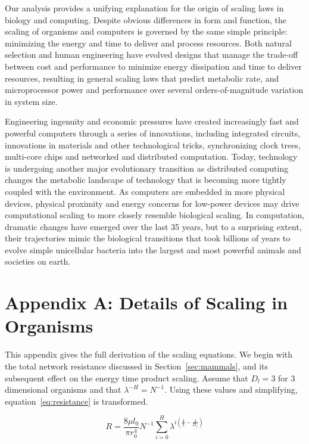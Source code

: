 \documentclass[12pt]{article}
\begin{document}
Our analysis provides a unifying explanation for the origin of scaling laws in
biology and computing. Despite obvious differences in form and function, the
scaling of organisms and computers is governed by the same simple principle: minimizing the energy and time to deliver and process resources. Both natural selection and human engineering have evolved designs that manage the trade-off between cost and performance to minimize energy dissipation and time to deliver resources, resulting in general scaling laws that predict metabolic rate, and microprocessor power and performance over several orders-of-magnitude variation in system size. 

Engineering ingenuity and economic pressures have created increasingly
fast and powerful computers through a series of innovations, including
integrated circuits, innovations in materials and other technological
tricks, synchronizing clock trees, multi-core chips and networked and
distributed computation. Today, technology is undergoing another
major evolutionary transition as distributed computing changes the
metabolic landscape of technology that is becoming more tightly coupled with the
environment. As computers are embedded in more physical devices,
physical proximity and energy concerns for low-power devices may drive
computational scaling to more closely resemble biological scaling. In
computation, dramatic changes have emerged over the last 35 years, but
to a surprising extent, their trajectories mimic the biological
transitions that took billions of years to evolve simple unicellular
bacteria into the largest and most powerful animals and societies on
earth.


\newpage

\section{Appendix A: Details of Scaling in Organisms}
\label{sec:AppendixOrg}

This appendix gives the full derivation of the scaling equations.  We
begin with the total network resistance discussed in
Section~\ref{sec:mammals}, and its subsequent effect on the energy
time product scaling. Assume that $D_l = 3$ for $3$ dimensional
organisms and that $\lambda^{-H}=N^{-1}$.  Using these values and
simplifying, equation~\ref{eq:resistance} is transformed.

\begin{equation}
 R = \frac{8 \mu l_0}{\pi r_0^4} N^{-1} \sum_{i=0}^H \lambda^{i(\frac{4}{3} -\frac{4}{D_r})}
\end{equation}
\end{document}
